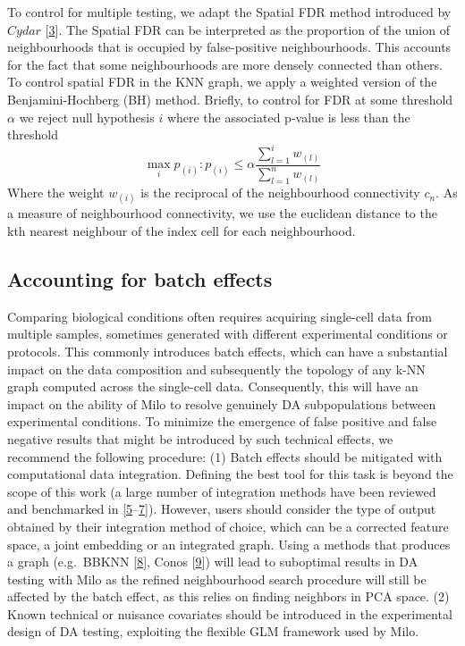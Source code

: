 \documentclass[
]{article}
\begin{document}
To control for multiple testing, we adapt the Spatial FDR method introduced by \(Cydar\) {[}\protect\hyperlink{ref-lunTestingDifferentialAbundance2017}{3}{]}. The Spatial FDR can be interpreted as the proportion of the union of neighbourhoods that is occupied by false-positive neighbourhoods. This accounts for the fact that some neighbourhoods are more densely connected than others. To control spatial FDR in the KNN graph, we apply a weighted version of the Benjamini-Hochberg (BH) method. Briefly, to control for FDR at some threshold \(\alpha\) we reject null hypothesis \(i\) where the associated p-value is less than the threshold
\[
\max_i{p_{(i)}: p_{(i)}\le \alpha\frac{\sum_{l=1}^{i}w_{(l)}}{\sum_{l=1}^{n}w_{(l)}}}
\]
Where the weight \(w_{(i)}\) is the reciprocal of the neighbourhood connectivity \(c_n\). As a measure of neighbourhood connectivity, we use the euclidean distance to the kth nearest neighbour of the index cell for each neighbourhood.

\hypertarget{accounting-for-batch-effects}{%
\subsection{Accounting for batch effects}\label{accounting-for-batch-effects}}

Comparing biological conditions often requires acquiring single-cell data from multiple samples, sometimes generated with different experimental conditions or protocols. This commonly introduces batch effects, which can have a substantial impact on the data composition and subsequently the topology of any k-NN graph computed across the single-cell data. Consequently, this will have an impact on the ability of Milo to resolve genuinely DA subpopulations between experimental conditions. To minimize the emergence of false positive and false negative results that might be introduced by such technical effects, we recommend the following procedure: (1) Batch effects should be mitigated with computational data integration. Defining the best tool for this task is beyond the scope of this work (a large number of integration methods have been reviewed and benchmarked in {[}\protect\hyperlink{ref-lueckenBenchmarkingAtlaslevelData2020}{5}--\protect\hyperlink{ref-tranBenchmarkBatcheffectCorrection2020}{7}{]}). However, users should consider the type of output obtained by their integration method of choice, which can be a corrected feature space, a joint embedding or an integrated graph. Using a methods that produces a graph (e.g.~BBKNN {[}\protect\hyperlink{ref-polanskiBBKNNFastBatch}{8}{]}, Conos {[}\protect\hyperlink{ref-barkasJointAnalysisHeterogeneous2019}{9}{]}) will lead to suboptimal results in DA testing with Milo as the refined neighbourhood search procedure will still be affected by the batch effect, as this relies on finding neighbors in PCA space. (2) Known technical or nuisance covariates should be introduced in the experimental design of DA testing, exploiting the flexible GLM framework used by Milo.
\end{document}
